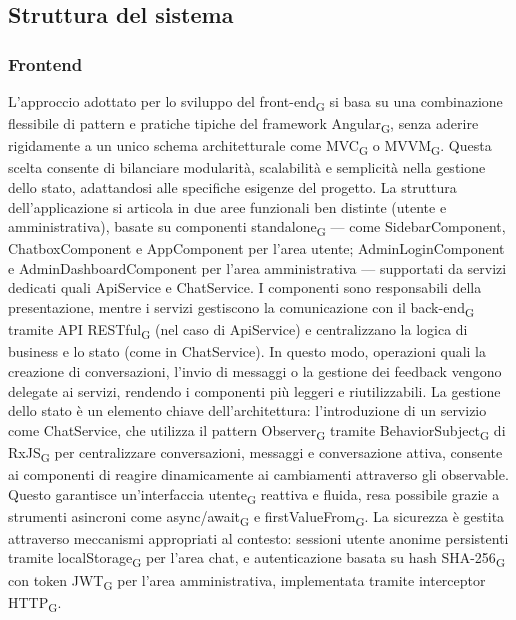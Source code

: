 \subsection{Struttura del sistema}
\subsubsection{Frontend}
L'approccio adottato per lo sviluppo del front-end\textsubscript{G} si basa su una combinazione flessibile di pattern e pratiche tipiche del framework Angular\textsubscript{G}, senza aderire rigidamente a un unico schema architetturale come MVC\textsubscript{G} o MVVM\textsubscript{G}. Questa scelta consente di bilanciare modularità, scalabilità e semplicità nella gestione dello stato, adattandosi alle specifiche esigenze del progetto. 
\newline \newline La struttura dell'applicazione si articola in due aree funzionali ben distinte (utente e amministrativa), basate su componenti standalone\textsubscript{G} — come SidebarComponent, ChatboxComponent e AppComponent per l'area utente; AdminLoginComponent e AdminDashboardComponent per l'area amministrativa — supportati da servizi dedicati quali ApiService e ChatService. I componenti sono responsabili della presentazione, mentre i servizi gestiscono la comunicazione con il back-end\textsubscript{G} tramite API RESTful\textsubscript{G} (nel caso di ApiService) e centralizzano la logica di business e lo stato (come in ChatService). 
\newline \newline In questo modo, operazioni quali la creazione di conversazioni, l'invio di messaggi o la gestione dei feedback vengono delegate ai servizi, rendendo i componenti più leggeri e riutilizzabili. La gestione dello stato è un elemento chiave dell'architettura: l'introduzione di un servizio come ChatService, che utilizza il pattern Observer\textsubscript{G} tramite BehaviorSubject\textsubscript{G} di RxJS\textsubscript{G} per centralizzare conversazioni, messaggi e conversazione attiva, consente ai componenti di reagire dinamicamente ai cambiamenti attraverso gli observable. Questo garantisce un'interfaccia utente\textsubscript{G} reattiva e fluida, resa possibile grazie a strumenti asincroni come async/await\textsubscript{G} e firstValueFrom\textsubscript{G}.
\newline \newline La sicurezza è gestita attraverso meccanismi appropriati al contesto: sessioni utente anonime persistenti tramite localStorage\textsubscript{G} per l'area chat, e autenticazione basata su hash SHA-256\textsubscript{G} con token JWT\textsubscript{G} per l'area amministrativa, implementata tramite interceptor HTTP\textsubscript{G}.
